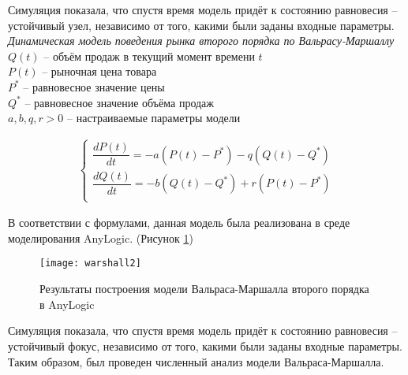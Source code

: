\newpage

Симуляция показала, что спустя время модель придёт к состоянию равновесия -- устойчивый узел, независимо от того, какими были заданы входные параметры.\\

\textit{Динамическая модель поведения рынка второго порядка по Вальрасу-Маршаллу}\\

$Q(t)$ -- объём продаж в текущий момент времени $t$\\
$P(t)$ -- рыночная цена товара\\
$P^*$ -- равновесное значение цены\\
$Q^*$ -- равновесное значение объёма продаж\\
$a, b, q, r > 0$ -- настраиваемые параметры модели

\begin{align*}
	\begin{cases}
		\dfrac{dP(t)}{dt} = -a (P(t) - P^*) - q(Q(t) - Q^*)\\[10pt]
		\dfrac{dQ(t)}{dt} = -b (Q(t) - Q^*) + r(P(t) - P^*)\\
	\end{cases}
\end{align*}

В соответствии с формулами, данная модель была реализована в среде моделирования AnyLogic. (Рисунок \ref{fig:warshall2})
\begin{figure}[h]
	\centering \texttt{[image: warshall2]}
	\caption{Результаты построения модели Вальраса-Маршалла второго порядка в AnyLogic}
	\label{fig:warshall2}
\end{figure}

Симуляция показала, что спустя время модель придёт к состоянию равновесия -- устойчивый фокус, независимо от того, какими были заданы входные параметры.\\

Таким образом, был проведен численный анализ модели Вальраса-Маршалла.